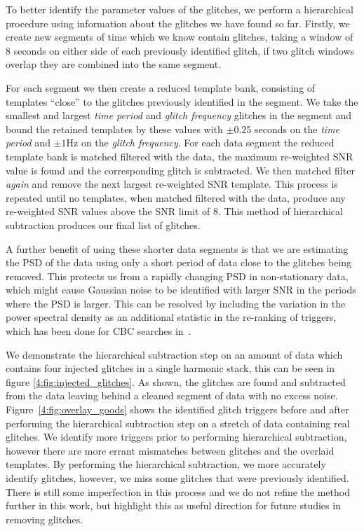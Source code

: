 To better identify the parameter values of the \scl{} glitches, we perform a hierarchical procedure using information about the glitches we have found so far. Firstly, we create new segments of time which we know contain \scl{} glitches, taking a window of $8$ seconds on either side of each previously identified glitch, if two glitch windows overlap they are combined into the same segment.

For each segment we then create a reduced template bank, consisting of templates ``close'' to the \scl{} glitches previously identified in the segment. We take the smallest and largest \emph{time period} and \emph{glitch frequency} glitches in the segment and bound the retained templates by these values with $\pm 0.25$ seconds on the \emph{time period} and $\pm 1$Hz on the \emph{glitch frequency}. For each data segment the reduced template bank is matched filtered with the data, the maximum re-weighted SNR value is found and the corresponding glitch is subtracted. We then matched filter \emph{again} and remove the next largest re-weighted SNR template. This process is repeated until no templates, when matched filtered with the data, produce any re-weighted SNR values above the SNR limit of $8$. This method of hierarchical subtraction produces our final list of \scl{} glitches.

A further benefit of using these shorter data segments is that we are estimating the PSD of the data using only a short period of data close to the \scl{} glitches being removed. This protects us from a rapidly changing PSD in non-stationary data, which might cause Gaussian noise to be identified with larger SNR in the periods where the PSD is larger. This can be resolved by including the variation in the power spectral density as an additional statistic in the re-ranking of triggers, which has been done for CBC \gw{} searches in~\cite{PSD_var:2020}.

We demonstrate the hierarchical subtraction step on an amount of data which contains four injected \scl{} glitches in a single harmonic stack, this can be seen in figure \ref{4:fig:injected_glitches}. As shown, the \scl{} glitches are found and subtracted from the data leaving behind a cleaned segment of \gw{} data with no excess noise. Figure~\ref{4:fig:overlay_goods} shows the identified \scl{} glitch triggers before and after performing the hierarchical subtraction step on a stretch of data containing real \scl{} glitches. We identify more triggers prior to performing hierarchical subtraction, however there are more errant mismatches between \scl{} glitches and the overlaid templates. By performing the hierarchical subtraction, we more accurately identify \scl{} glitches, however, we miss some glitches that were previously identified. There is still some imperfection in this process and we do not refine the method further in this work, but highlight this as useful direction for future studies in removing \scl{} glitches. 

